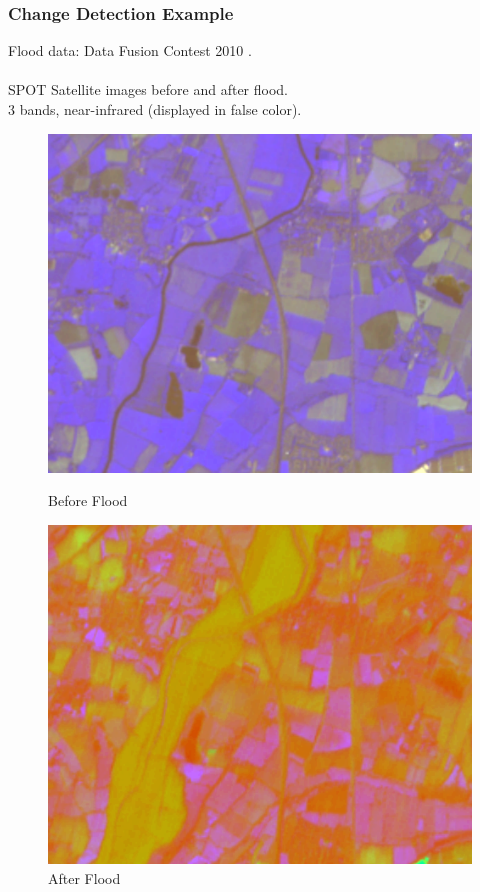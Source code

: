 \documentclass{beamer}
\begin{document}
\begin{frame}
  \frametitle{Change Detection Example}
  Flood data: Data Fusion Contest 2010 \cite{Longbotham2012}.\\~\\
  SPOT Satellite images before and after flood.\\
  3 bands, near-infrared (displayed in false color).
  \begin{figure}[ht]
    \centering
    \hfill
    \begin{minipage}[b]{0.40\linewidth}
      \centering
      \includegraphics[width=\textwidth]{./Images/ChangeDetect/Flood/pictureX.png}
      \caption{Before Flood}
    \end{minipage}
    \hfill
    \begin{minipage}[b]{0.40\linewidth}
      \centering
      \includegraphics[width=\textwidth]{./Images/ChangeDetect/Flood/pictureY.png}
      \caption{After Flood}
    \end{minipage}
    \hfill
  \end{figure}
\end{frame}
\end{document}
